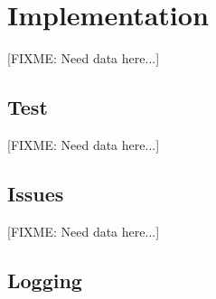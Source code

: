\documentclass[12pt,letterpaper,dvips]{article}
\newcommand{\FIXME}[1]{\textsf{[FIXME: #1]}}
\begin{document}
\section{Implementation}
\FIXME{Need data here...}


\newpage
\subsection{Test}
\FIXME{Need data here...}


\newpage
\subsection{Issues}
\FIXME{Need data here...}


\subsection{Logging}


\end{document}
